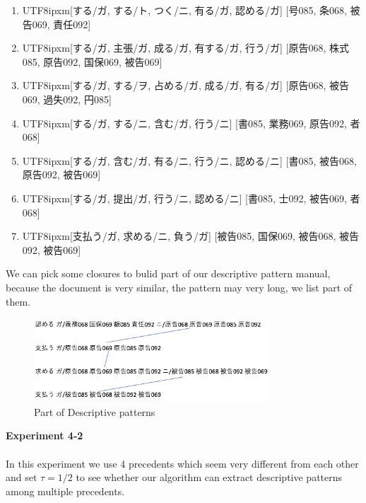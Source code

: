 \begin{enumerate}
\item \begin{CJK}{UTF8}{ipxm}[する/ガ, する/ト, つく/ニ, 有る/ガ, 認める/ガ] [号085, 条068, 被告069, 責任092]\end{CJK}
\item \begin{CJK}{UTF8}{ipxm}[する/ガ, 主張/ガ, 成る/ガ, 有する/ガ, 行う/ガ] [原告068, 株式085, 原告092, 国保069, 被告069]\end{CJK}
\item \begin{CJK}{UTF8}{ipxm}[する/ガ, する/ヲ, 占める/ガ, 成る/ガ, 有る/ガ] [原告068, 被告069, 過失092, 円085]\end{CJK}
\item \begin{CJK}{UTF8}{ipxm}[する/ガ, する/ニ, 含む/ガ, 行う/ニ] [書085, 業務069, 原告092, 者068]\end{CJK}
\item \begin{CJK}{UTF8}{ipxm}[する/ガ, 含む/ガ, 有る/ニ, 行う/ニ, 認める/ニ] [書085, 被告068, 原告092, 被告069]\end{CJK}
\item \begin{CJK}{UTF8}{ipxm}[する/ガ, 提出/ガ, 行う/ニ, 認める/ニ] [書085, 士092, 被告069, 者068]\end{CJK}
\item \begin{CJK}{UTF8}{ipxm}[支払う/ガ, 求める/ニ, 負う/ガ] [被告085, 国保069, 被告068, 被告092, 被告069]\end{CJK}
\end{enumerate}
We can pick some closures to bulid part of our descriptive pattern manual, because the document is very similar, the pattern may very long, we list part of them.
\begin{figure}[!h]
\centering
\includegraphics[width=250pt]{./pictures/0403-1.png}
\caption{Part of Descriptive patterns}
\end{figure}
\newpage
\textbf{Experiment 4-2}
\\ \\
In this experiment we use 4 precedents which seem very different from each other and set $\tau = 1/2$ to see whether our algorithm can extract descriptive patterns among multiple precedents.
